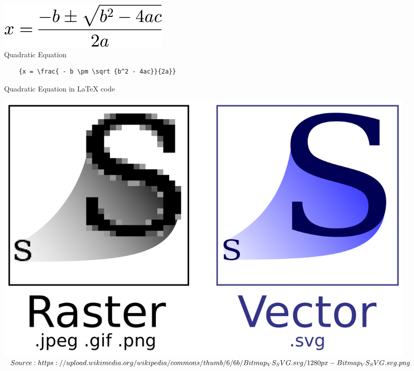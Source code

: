 \begin{figure}
	\begin{center}
	\includegraphics[width=\linewidth/3]{figures/QuadraticEquation.png}
	\end{center}
	\caption{Quadratic Equation}
	\label{fig:quadEquaPng}
\end{figure}

\begin{figure}
	\begin{lstlisting}
	{x = \frac{ - b \pm \sqrt {b^2 - 4ac}}{2a}}
	\end{lstlisting}
	\caption{Quadratic Equation in LaTeX code}
	\label{fig:quadEquaLatex}
\end{figure}

\begin{figure}
	\begin{center}
		\includegraphics[width=\linewidth/2]{figures/bitmapVsSvg.png}
	\end{center}
	
	\caption{$Source: https://upload.wikimedia.org/wikipedia/commons/thumb/\\6/6b/Bitmap_VS_SVG.svg/1280px-Bitmap_VS_SVG.svg.png$}
	\label{fig:bitmapSvg}
\end{figure}

